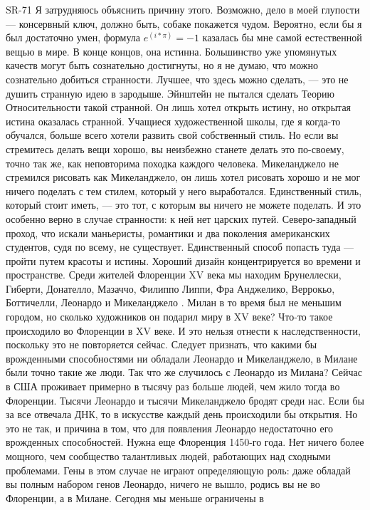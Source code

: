\documentclass[ebook,12pt,oneside,openany]{memoir}
\begin{document}
SR-71 Я затрудняюсь объяснить причину этого. Возможно, дело в моей
глупости — консервный ключ, должно быть, собаке покажется чудом.
Вероятно, если бы я был достаточно умен, формула $ e^(i* \pi) = -1 $
казалась бы мне самой естественной вещью в мире. В конце концов, она
истинна. Большинство уже упомянутых качеств могут быть сознательно
достигнуты, но я не думаю, что можно сознательно добиться странности.
Лучшее, что здесь можно сделать, — это не душить странную идею в
зародыше. Эйнштейн не пытался сделать Теорию Относительности такой
странной. Он лишь хотел открыть истину, но открытая истина оказалась
странной. Учащиеся художественной школы, где я когда-то обучался,
больше всего хотели развить свой собственный стиль. Но если вы
стремитесь делать вещи хорошо, вы неизбежно станете делать это
по-своему, точно так же, как неповторима походка каждого человека.
Микеланджело не стремился рисовать как Микеланджело, он лишь хотел
рисовать хорошо и не мог ничего поделать с тем стилем, который у него
выработался. Единственный стиль, который стоит иметь, — это тот, с
которым вы ничего не можете поделать. И это особенно верно в случае
странности: к ней нет царских путей. Северо-западный проход, что
искали маньеристы, романтики и два поколения американских студентов,
судя по всему, не существует. Единственный способ попасть туда —
пройти путем красоты и истины. Хороший дизайн концентрируется во
времени и пространстве. Среди жителей Флоренции XV века мы находим
Брунеллески, Гиберти, Донателло, Мазаччо, Филиппо Липпи, Фра
Анджелико, Веррокьо, Боттичелли, Леонардо и Микеланджело . Милан в то
время был не меньшим городом, но сколько художников он подарил миру в
XV веке? Что-то такое происходило во Флоренции в XV веке. И это нельзя
отнести к наследственности, поскольку это не повторяется сейчас.
Следует признать, что какими бы врожденными способностями ни обладали
Леонардо и Микеланджело, в Милане были точно такие же люди. Так что же
случилось с Леонардо из Милана? Сейчас в США проживает примерно в
тысячу раз больше людей, чем жило тогда во Флоренции. Тысячи Леонардо
и тысячи Микеланджело бродят среди нас. Если бы за все отвечала ДНК,
то в искусстве каждый день происходили бы открытия. Но это не так, и
причина в том, что для появления Леонардо недостаточно его врожденных
способностей. Нужна еще Флоренция 1450-го года. Нет ничего более
мощного, чем сообщество талантливых людей, работающих над сходными
проблемами. Гены в этом случае не играют определяющую роль: даже
обладай вы полным набором генов Леонардо, ничего не вышло, родись вы
не во Флоренции, а в Милане. Сегодня мы меньше ограничены в
\end{document}
